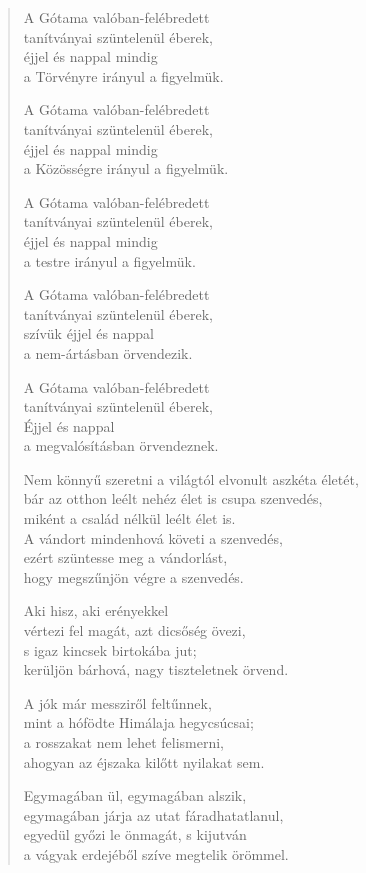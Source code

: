 \begin{verse}
 A Gótama valóban-felébredett\\
tanítványai szüntelenül éberek,\\
éjjel és nappal mindig\\
a Törvényre irányul a figyelmük.

 A Gótama valóban-felébredett\\
tanítványai szüntelenül éberek,\\
éjjel és nappal mindig\\
a Közösségre irányul a figyelmük.

 A Gótama valóban-felébredett\\
tanítványai szüntelenül éberek,\\
éjjel és nappal mindig\\
a testre irányul a figyelmük.

 A Gótama valóban-felébredett\\
tanítványai szüntelenül éberek,\\
szívük éjjel és nappal\\
a nem-ártásban örvendezik.

 A Gótama valóban-felébredett\\
tanítványai szüntelenül éberek,\\
Éjjel és nappal\\
a megvalósításban örvendeznek.

 Nem könnyű szeretni a világtól elvonult aszkéta életét,\\
bár az otthon leélt nehéz élet is csupa szenvedés,\\
miként a család nélkül leélt élet is.\\
A vándort mindenhová követi a szenvedés,\\
ezért szüntesse meg a vándorlást,\\
hogy megszűnjön végre a szenvedés.

 Aki hisz, aki erényekkel\\
vértezi fel magát, azt dicsőség övezi,\\
s igaz kincsek birtokába jut;\\
kerüljön bárhová, nagy tiszteletnek örvend.

 A jók már messziről feltűnnek,\\
mint a hófödte Himálaja hegycsúcsai;\\
a rosszakat nem lehet felismerni,\\
ahogyan az éjszaka kilőtt nyilakat sem.

 Egymagában ül, egymagában alszik,\\
egymagában járja az utat fáradhatatlanul,\\
egyedül győzi le önmagát, s kijutván\\
a vágyak erdejéből szíve megtelik örömmel.

\end{verse}

